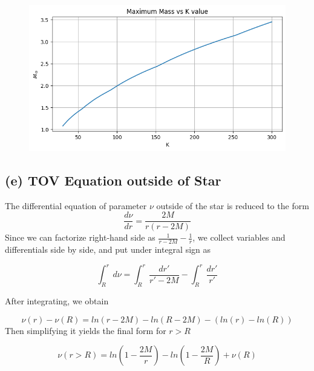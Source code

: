 \documentclass[aps,twocolumn,showpacs,preprintnumbers,nofootinbib,prl,superscriptaddress,groupedaddress]{revtex4-2}
\begin{document}
\begin{figure}[!htb]
	\centering
	\includegraphics[width=0.5\linewidth]{Plots/einstein-part-d}
	\caption{}
	\label{fig:einstein-part-d}
\end{figure}

\subsection{(e) TOV Equation outside of Star}

The differential equation of parameter $\nu$ outside of the star is reduced to the form
\begin{equation}
	\frac{d\nu}{dr} = \frac{2M}{r(r-2M)}
\end{equation}
Since we can factorize right-hand side as $\frac{1}{r-2M}-\frac{1}{r}$, we collect variables and differentials side by side, and put under integral sign as

\begin{equation}
	\int_R^{r}d\nu  =\int_R^{r}\frac{dr'}{r'-2M}-\int_R^{r}\frac{dr'}{r'}
\end{equation}

After integrating, we obtain

\begin{equation}
	\nu(r)-\nu(R)  = ln(r-2M)-ln(R-2M)-(ln(r)-ln(R))
\end{equation}
Then simplifying it yields the final form for $r > R$

\begin{equation}
	\nu(r > R)  = ln(1-\frac{2M}{r})-ln(1-\frac{2M}{R}) + \nu(R)
\end{equation}
\end{document}
